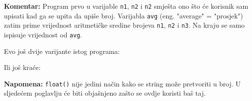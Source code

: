 	\textbf{Komentar:} Program prvo u varijable \verb+n1+, \verb+n2+ i \verb+n2+
	smje\v sta ono \v sto \' ce korisnik sam upisati kad ga se upita da upi\v se broj.
	Varijabla \verb"avg" (eng. "average" = "prosjek") zatim prime vrijednost
	aritmeti\v cke sredine brojeva 
	\verb"n1",
	\verb"n2" i 
	\verb"n3".
	Na kraju se samo ispisuje vrijednost od \verb"avg".

	Evo jo\v s dvije varijante istog programa:


	Ili jo\v s kra\' ce:


	\textbf{Napomena:} \verb+float()+ nije jedini na\v cin kako se string mo\v ze
	pretvoriti u broj. U sljede\' cem poglavlju \' ce biti obja\v snjeno za\v sto se
	ovdje koristi ba\v s taj.


